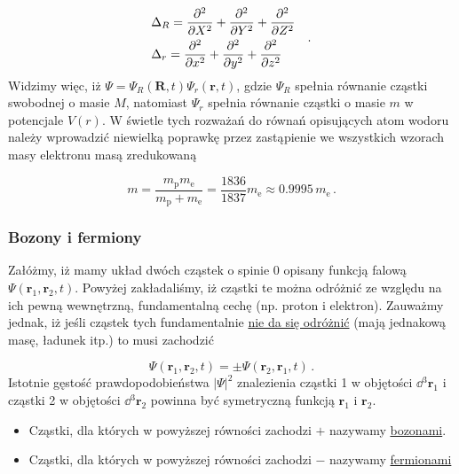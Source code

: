 \documentclass{myclass}
\begin{document}
\begin{itemize}
\begin{equation*}
    \begin{split}
        &\Delta_R=\pdv[2]{ }{X}+\pdv[2]{ }{Y}+\pdv[2]{ }{Z}\\
        &\Delta_r=\pdv[2]{ }{x}+\pdv[2]{ }{y}+\pdv[2]{ }{z}
    \end{split}\quad.
\end{equation*}
Widzimy więc, iż \(\Psi=\Psi_R(\mathbf{R},t)\Psi_r(\mathbf{r},t)\), gdzie \(\Psi_R\) spełnia
równanie cząstki swobodnej o masie \(M\), natomiast \(\Psi_r\) spełnia równanie cząstki o masie
\(m\) w potencjale \(V(r)\). W świetle tych rozważań do równań opisujących atom wodoru należy
wprowadzić niewielką poprawkę przez zastąpienie we wszystkich wzorach masy elektronu masą
zredukowaną

\begin{equation*}
    m=\frac{m_\text{p}m_\text{e}}{m_\text{p}+m_\text{e}}=\frac{1836}{1837}m_\text{e}\approx 0.9995\,m_\text{e}\,.
\end{equation*}
\end{itemize}

\subsubsection{Bozony i fermiony}

Załóżmy, iż mamy układ dwóch cząstek o spinie 0 opisany funkcją falową
\(\Psi(\mathbf{r}_1,\mathbf{r}_2,t)\). Powyżej zakładaliśmy, iż cząstki te można odróżnić ze względu
na ich pewną wewnętrzną, fundamentalną cechę (np. proton i elektron). Zauważmy jednak, iż jeśli
cząstek tych fundamentalnie \underline{nie da się odróżnić} (mają jednakową masę, ładunek itp.) to
musi zachodzić 

\begin{equation*}
\boxed{\Psi(\mathbf{r}_1,\mathbf{r}_2,t)=\pm\Psi(\mathbf{r}_2,\mathbf{r}_1,t)}\,.
\end{equation*}
Istotnie gęstość prawdopodobieństwa \(|\Psi|^2\) znalezienia cząstki 1 w objętości
\(\dd{^3\mathbf{r}_1}\) i cząstki 2 w objętości \(\dd{^3\mathbf{r}_2}\) powinna być symetryczną
funkcją \(\mathbf{r}_1\) i \(\mathbf{r}_2\).

\begin{itemize}

\item Cząstki, dla których w powyższej równości zachodzi \(+\) nazywamy \underline{bozonami}.

\item Cząstki, dla których w powyższej równości zachodzi \(-\) nazywamy
\underline{fermionami}
\end{itemize}
\end{document}

